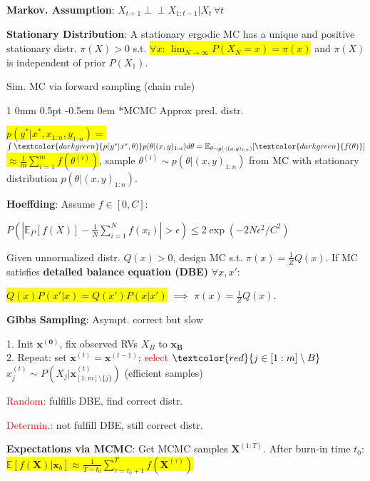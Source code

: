 \documentclass[11pt,landscape,a4paper,fleqn]{article}
\makeatletter
\newcommand*{\rsection}{%
	\@startsection{section}%
	{1}%
	{0mm}%
	{0.5pt}%
	{-0.5em \@plus 0em}
	{\color{myorange}\sffamily\small\bfseries}}
\newcommand{\mhl}[1]{\setlength{\fboxsep}{0pt}\colorbox{yellow}{#1}}
\newcommand{\indep}{\perp\!\!\!\perp}
\makeatother
\begin{document}
\begin{multicols*}{4}
		\textbf{Markov. Assumption}: $X_{t+1} \indep X_{1:t-1} | X_t \, \forall t$

		\textbf{Stationary Distribution}: A stationary ergodic MC has a unique and positive stationary distr. $\pi(X) > 0$ s.t. \mhl{$\forall x$: $\lim_{N \rightarrow \infty} P(X_N = x) = \pi(x)$} and $\pi(X)$ is independent of prior $P(X_1)$.

		Sim. MC via forward sampling (chain rule)

		\rsection*{MCMC} Approx pred. distr.

		\mhl{$p(y^* | x^*, x_{1:n}, y_{1:n}) =$}
	$\int \textcolor{darkgreen}{p(y^* | x^*, \theta)} p(\theta | (x,y)_{1:n})d\theta = \mathbb{E}_{\theta \sim p(\cdot | (x,y)_{1:n})}[\textcolor{darkgreen}{f(\theta)}]$
		\mhl{$\approx \frac{1}{m} \sum_{i=1}^{m} f(\theta^{(i)})$},
		sample $\theta^{(i)} \sim p(\theta | (x,y)_{1:n})$ from MC with stationary distribution $p(\theta| (x,y)_{1:n})$.


		\textbf{Hoeffding}: Assume $f \in [0,C]$:

		\mbox{\fontsize{9}{6}\selectfont $P(|\mathbb{E}_P[f(X)] - \frac{1}{N}\sum_{i=1}^{N} f(x_i)| > \epsilon) \leq 2 \exp(-2N\epsilon^2/C^2)$}



		Given unnormalized distr. $Q(x) > 0$, design MC s.t. $\pi(x) = \frac{1}{Z} Q(x)$. If MC satisfies \textbf{detailed balance equation (DBE)} $\forall x,x'$:

		\vspace*{-1mm}
		\mhl{$Q(x)P(x' | x) = Q(x')P(x | x')$} $\implies$ $\pi(x) = \frac{1}{Z} Q(x)$.

		\textbf{Gibbs Sampling}: Asympt. correct but slow

		1. Init $\mathbf{x^{(0)}}$, fix observed RVs $X_B$ to $\mathbf{x_B}$\\
		2. Repeat: set $\mathbf{x}^{(t)} = \mathbf{x}^{(t-1)}$; \textcolor{red}{select} $\textcolor{red}{j \in [1:m] \setminus B}$\\
	$x_j^{(t)} \sim P(X_j | \mathbf{x}^{(t)}_{[1:m] \setminus \{j\}})$ (efficient samples)

		\textcolor{red}{Random:} fulfills DBE, find correct distr.

		\textcolor{red}{Determin.:} not fulfill DBE, still correct distr.

		\textbf{Expectations via MCMC}: Get MCMC samples $\mathbf{X}^{(1:T)}$. After burn-in time $t_0$:
		\mhl{$\mathbb{E}[f(\mathbf{X}) | \mathbf{x}_b] \approx \frac{1}{T - t_0} \sum_{\tau = t_0 + 1}^{T} f(\mathbf{X}^{(\tau)})$}



\end{multicols*}
\end{document}

